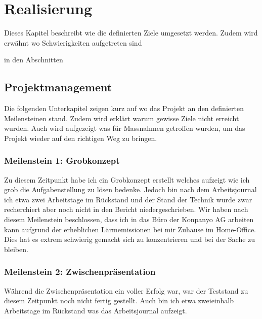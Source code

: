\chapter{Realisierung}


Dieses Kapitel beschreibt wie die definierten Ziele umgesetzt werden.
Zudem wird erwähnt wo Schwierigkeiten aufgetreten sind 

in den Abschnitten 

\section{Projektmanagement}\label{sec:real_projektmanagement}

Die folgenden Unterkapitel zeigen kurz auf wo das Projekt an den definierten Meilensteinen stand.
Zudem wird erklärt warum gewisse Ziele nicht erreicht wurden. Auch wird aufgezeigt was für Massnahmen getroffen wurden, um das Projekt wieder auf den richtigen Weg zu bringen.

\subsection{Meilenstein 1: Grobkonzept}

Zu diesem Zeitpunkt habe ich ein Grobkonzept erstellt welches aufzeigt wie ich grob die Aufgabenstellung zu lösen bedenke.
Jedoch bin nach dem Arbeitsjournal ich etwa zwei Arbeitstage im Rückstand und der Stand der Technik wurde zwar recherchiert aber noch nicht in den Bericht niedergeschrieben.
Wir haben nach diesem Meilenstein beschlossen, dass ich in das Büro der Konpanyo AG arbeiten kann aufgrund der erheblichen Lärmemissionen bei mir Zuhause im Home-Office. Dies hat es extrem schwierig gemacht sich zu konzentrieren und bei der Sache zu bleiben.

\subsection{Meilenstein 2: Zwischenpräsentation}

Während die Zwischenpräsentation ein voller Erfolg war, war der Teststand zu diesem Zeitpunkt noch nicht fertig gestellt. Auch bin ich etwa zweieinhalb Arbeitstage im Rückstand was das Arbeitsjournal aufzeigt.

